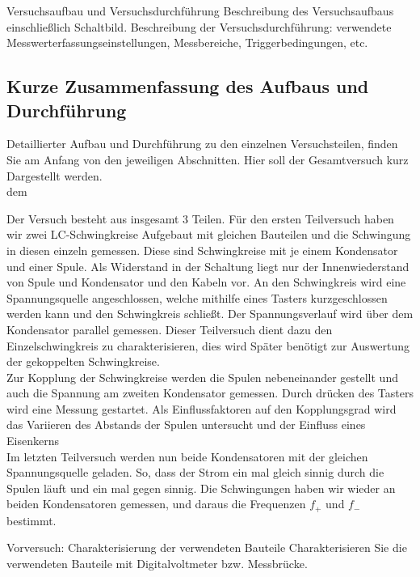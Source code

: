 \documentclass[twoside]{protokoll}
\begin{document}
 
\begin{aufgabe}{Versuchsaufbau und Versuchsdurchführung}
  Beschreibung des Versuchsaufbaus einschließlich
  Schaltbild. Beschreibung der Versuchsdurchführung: verwendete
  Messwerterfassungseinstellungen, Messbereiche, Triggerbedingungen,
  etc.
\end{aufgabe}

\subsection{Kurze Zusammenfassung des Aufbaus und Durchführung}

Detaillierter Aufbau und Durchführung zu den einzelnen Versuchsteilen, finden Sie am Anfang von den jeweiligen Abschnitten. 
Hier soll der Gesamtversuch kurz Dargestellt werden.\\dem 

Der Versuch besteht aus insgesamt 3 Teilen. Für den ersten Teilversuch haben wir zwei LC-Schwingkreise Aufgebaut mit gleichen Bauteilen und die Schwingung in diesen einzeln gemessen. 
Diese sind Schwingkreise mit je einem Kondensator und einer Spule.
Als Widerstand in der Schaltung liegt nur der Innenwiederstand von Spule und Kondensator und den Kabeln vor. 
An den Schwingkreis wird eine Spannungsquelle angeschlossen, welche mithilfe eines Tasters kurzgeschlossen werden kann und den Schwingkreis schließt. 
Der Spannungsverlauf wird über dem Kondensator parallel gemessen. 
Dieser Teilversuch dient dazu den Einzelschwingkreis zu charakterisieren, dies wird Später benötigt zur Auswertung der gekoppelten Schwingkreise.\\

Zur Kopplung der Schwingkreise werden die Spulen nebeneinander gestellt und auch die Spannung am zweiten Kondensator gemessen. Durch drücken des Tasters wird eine Messung gestartet.
Als Einflussfaktoren auf den Kopplungsgrad wird das Variieren des Abstands der Spulen untersucht und der Einfluss eines Eisenkerns\\

Im letzten Teilversuch werden nun beide Kondensatoren mit der gleichen Spannungsquelle geladen. 
So, dass der Strom ein mal gleich sinnig durch die Spulen läuft und ein mal gegen sinnig. Die Schwingungen haben wir wieder an beiden Kondensatoren gemessen, und daraus die Frequenzen $f_+$ und $f_-$ bestimmt. 
 

\begin{aufgabe}{Vorversuch: Charakterisierung der verwendeten Bauteile}
  Charakterisieren Sie die verwendeten Bauteile mit Digitalvoltmeter
  bzw. Messbrücke.
\end{aufgabe}
\end{document}
